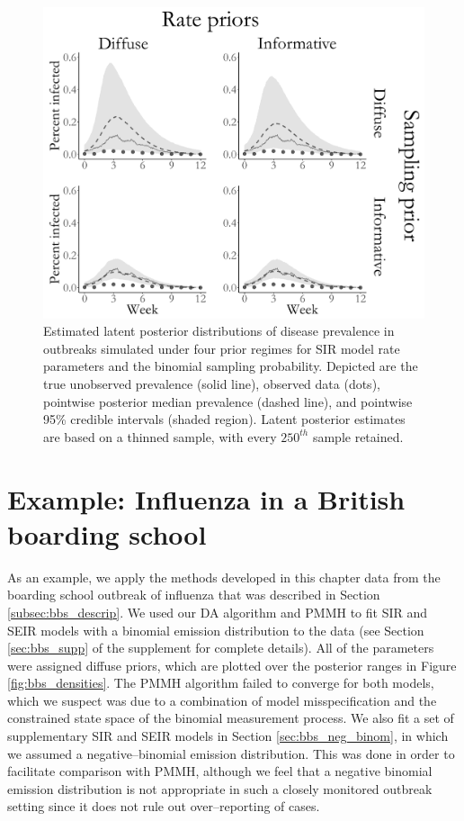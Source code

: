 \begin{figure}[htbp]
	\centering
	\includegraphics[width=0.6\linewidth]{figures/prior_latent_posts.pdf}
	\caption[Estimated latent posterior for an SIR model under four prior regimes.]{Estimated latent posterior distributions of disease prevalence in outbreaks simulated under four prior regimes for SIR model rate parameters and the binomial sampling probability. Depicted are the true unobserved prevalence (solid line), observed data (dots), pointwise posterior median prevalence (dashed line), and pointwise 95\% credible intervals (shaded region). Latent posterior estimates are based on a thinned sample, with every $250^{th}$ sample retained.}
	\label{fig:prior_latent_posts}
\end{figure}

\section{Example: Influenza in a British boarding school}
\label{sec:bda_bbs}

As an example, we apply the methods developed in this chapter data from the boarding school outbreak of influenza that was described in Section \ref{subsec:bbs_descrip}. We used our DA algorithm and PMMH to fit SIR and SEIR models with a binomial emission distribution to the data (see Section \ref{sec:bbs_supp} of the supplement for complete details). All of the parameters were assigned diffuse priors, which are plotted over the posterior ranges in Figure \ref{fig:bbs_densities}. The PMMH algorithm failed to converge for both models, which we suspect was due to a combination of model misspecification and the constrained state space of the binomial measurement process. We also fit a set of supplementary SIR and SEIR models in Section \ref{sec:bbs_neg_binom}, in which we assumed a negative--binomial emission distribution. This was done in order to facilitate comparison with PMMH, although we feel that a negative binomial emission distribution is not appropriate in such a closely monitored outbreak setting since it does not rule out over--reporting of cases.

